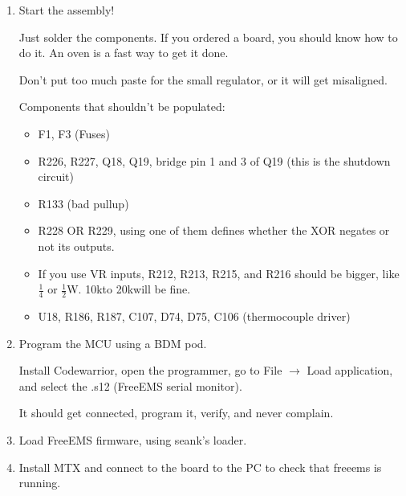 \documentclass[12pt,a4paper,titlepage]{article}
\begin{document}
\begin{enumerate}
\item Start the assembly!

Just solder the components. If you ordered a board, you should know how to do it. An oven is a fast way to get it done.

Don't put too much paste for the small regulator, or it will get misaligned.

Components that shouldn't be populated:

\begin{itemize}
\item F1, F3 (Fuses)
\item R226, R227, Q18, Q19, bridge pin 1 and 3 of Q19 (this is the shutdown circuit)
\item R133 (bad pullup)
\item R228 OR R229, using one of them defines whether the XOR negates or not its outputs.
\item If you use VR inputs, R212, R213, R215, and R216 should be bigger, like $\frac{1}{4}$ or $\frac{1}{2}$W. 10k\ohm to 20k\ohm will be fine.
\item U18, R186, R187, C107, D74, D75, C106 (thermocouple driver)
\end{itemize}

\item Program the MCU using a BDM pod.

Install Codewarrior, open the programmer, go to File $\rightarrow$ Load application, and select the .s12 (FreeEMS serial monitor).

It should get connected, program it, verify, and never complain.

\item Load FreeEMS firmware, using seank's loader.

\item Install MTX and connect to the board to the PC to check that freeems is running.

\end{enumerate}
\end{document}
